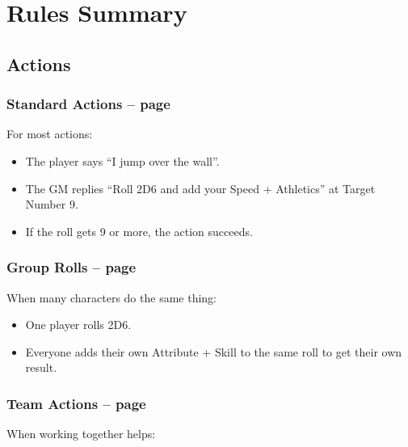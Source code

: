 \section*{Rules Summary}

\begin{multicols}{2}

\subsection{Actions}

\subsubsection{Standard Actions -- page \pageref{basicaction}}

For most actions:

\begin{itemize}

  \item{The player says ``I jump over the wall''.}
  \item{The GM replies ``Roll 2D6 and add your Speed + Athletics'' at Target Number 9.}
  \item{If the roll gets 9 or more, the action succeeds.}

\end{itemize}

\subsubsection{Group Rolls -- page \pageref{grouproll}}

When many characters do the same thing:

\begin{itemize}

  \item{One player rolls 2D6.}
  \item{Everyone adds their own Attribute + Skill to the same roll to get their own result.}

\end{itemize}

\subsubsection{Team Actions -- page \pageref{teamwork}}

When working together helps:

\begin{itemize}


\end{itemize}
\end{multicols}
